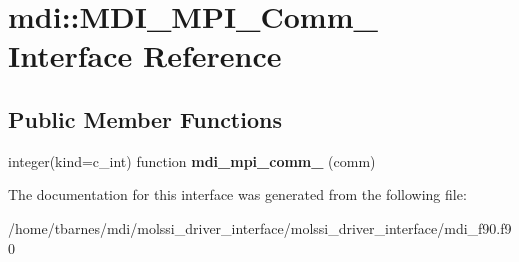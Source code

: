 \hypertarget{interfacemdi_1_1MDI__MPI__Comm__}{\section{mdi\-:\-:M\-D\-I\-\_\-\-M\-P\-I\-\_\-\-Comm\-\_\- Interface Reference}
\label{interfacemdi_1_1MDI__MPI__Comm__}
}
\subsection*{Public Member Functions}
\begin{DoxyCompactItemize}
\item 
\hypertarget{interfacemdi_1_1MDI__MPI__Comm___a040342e3651281cb946780ba23543d1a}{integer(kind=c\-\_\-int) function {\bfseries mdi\-\_\-mpi\-\_\-comm\-\_\-} (comm)}\label{interfacemdi_1_1MDI__MPI__Comm___a040342e3651281cb946780ba23543d1a}

\end{DoxyCompactItemize}


The documentation for this interface was generated from the following file\-:\begin{DoxyCompactItemize}
\item 
/home/tbarnes/mdi/molssi\-\_\-driver\-\_\-interface/molssi\-\_\-driver\-\_\-interface/mdi\-\_\-f90.\-f90\end{DoxyCompactItemize}
